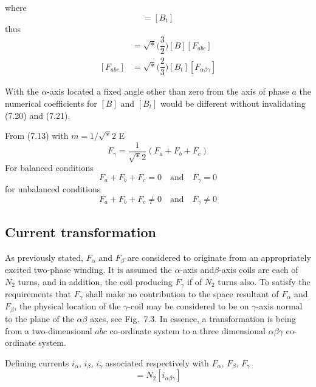 \documentclass[a4paper,numbers=noenddot,12pt]{scrbook}
\begin{document}
    where
    \begin{equation}
        [B^{-1}] = [B_t]
        \label{eq:Eq7.19}
    \end{equation}
    thus
    \begin{align}
        [F_{\alpha \beta \gamma}]  & = \sqrt*{\Big(\dfrac{3}{2}\Big)}  [B] [F_{abc}] \\
        [F_{abc}]  & =  \sqrt*{\Big(\dfrac{2}{3}\Big)}[B_t][F_{\alpha \beta \gamma}] %
        \label{eq:Eq7.21}
    \end{align}

    With the $\alpha$-axis located a fixed angle other than zero from the axis of phase $a$ the numerical coefficients for $[B]$ and $[B_t]$ would be different without invalidating (7.20) and (7.21).

    From (7.13) with $m = 1 / \sqrt*{2}$
    E\begin{equation}
        F_{\gamma} = \dfrac{1}{\sqrt*{2}}(F_a + F_b + F_c)
        \label{eq:Eq7.22}
    \end{equation}
    For balanced conditions
    \begin{equation*}
        F_a + F_b + F_c = 0 \quad \text{and} \quad F_{\gamma} = 0
    \end{equation*}
    for unbalanced conditions
    \begin{equation*}
        F_a + F_b + F_c \neq 0 \quad \text{and} \quad F_{\gamma} \neq 0
    \end{equation*}

    \subsection{Current transformation}
    As previously stated, $F_{\alpha}$ and $F_{\beta}$ are considered to originate from an appropriately excited two-phase winding. It is assumed the $\alpha$-axis and$\beta$-axis coils are each of $N_2$ turns, and in addition, the coil producing $F_{\gamma}$ if of $N_2$ turns also. To satisfy the requirements that $F_{\gamma}$ shall make no contribution to the space resultant of $F_{\alpha}$ and $F_{\beta}$, the physical location of the
    $\gamma$-coil may be considered to be on $\gamma$-axis normal to the plane of the $\alpha \beta$ axes, see Fig.\ 7.3. In essence, a transformation is being from a two-dimensional $abc$ co-ordinate system to a three dimensional $\alpha \beta \gamma$ co-ordinate system.

    Defining currents $i_{\alpha}$, $i_{\beta}$, $i_{\gamma}$ associated respectively with $F_{\alpha}$, $F_{\beta}$, $F_{\gamma}$
    \begin{equation}
        [F_{\alpha \beta \gamma}] = N_2 [i_{\alpha \beta \gamma}]
        \label{eq:Eq7.23}
    \end{equation}
\end{document}
